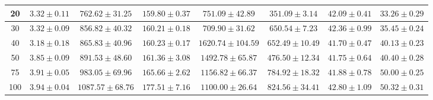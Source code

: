 \begin{table}[t!]
\begin{adjustwidth}{-0.2cm}{}
\begin{center}
\begin{tabular}{|c||c|c|c|c|c|c|c|}
\\
\hline
20 &$3.32\pm0.11$ & $762.62\pm31.25$  &  $159.80\pm0.37$  & $751.09\pm42.89$   &  $351.09\pm3.14$ &$42.09\pm0.41$ &  $33.26\pm0.29$   
\\
\hline 
 30  &$3.32\pm0.09$ & $856.82\pm40.32$  &  $160.21\pm0.18$  & $709.90\pm31.62$   &  $650.54\pm7.23$ &$42.36\pm0.99$ &  $35.45\pm0.24$  
\\
\hline
 40 & $3.18\pm0.18$ & $865.83\pm40.96$  &  $160.23\pm0.17$  & $1620.74\pm104.59$   &  $652.49\pm10.49$&$41.70\pm0.47$   &  $40.13\pm0.23$   
\\
\hline
 50  & $3.85\pm0.09$ & $891.53\pm48.60$  &  $161.36\pm3.08$  & $1492.78\pm65.87 $   &  $476.50\pm12.34$&$41.75\pm0.64$  &  $40.40\pm0.28$    
\\
\hline
 75  & $3.91\pm0.05$ & $983.05\pm69.96$  &  $165.66\pm2.62 $  & $1156.82\pm66.37$   &  $784.92\pm18.32$ &$41.88\pm0.78$ &  $50.00\pm0.25$  
\\
\hline
 100  & $3.94\pm0.04$ & $1087.57\pm68.76 $  &  $177.51\pm7.16$  & $1100.00\pm26.64$   &  $824.56\pm34.41$ &$42.80\pm1.09$ &  $50.32\pm0.31$    
\\
\hline
\end{tabular}
\end{center}
\end{adjustwidth}\vspace{-3mm}
\end{table}

